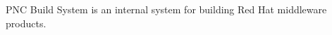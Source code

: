 \documentclass[../main.tex]{subfiles}
\begin{document}
PNC Build System is an internal system for building Red Hat middleware products. 
\end{document}
